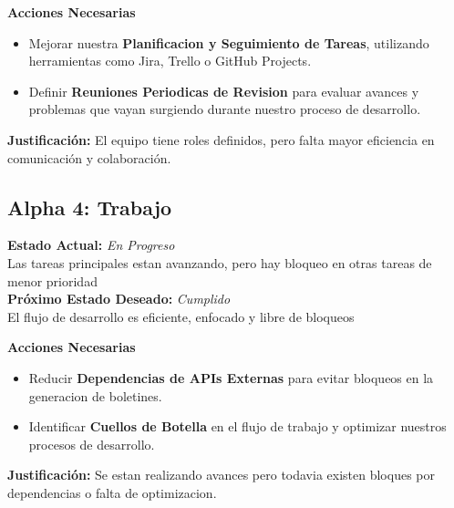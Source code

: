 \documentclass[12pt]{article}
\begin{document}
\vspace{0.1cm}

\textbf{Acciones Necesarias}
\begin{itemize}
    \item Mejorar nuestra \textbf{Planificacion y Seguimiento de Tareas}, 
    utilizando herramientas como Jira, Trello o GitHub Projects.
    \item Definir \textbf{Reuniones Periodicas de Revision}
    para evaluar avances y problemas que vayan surgiendo
    durante nuestro proceso de desarrollo.
\end{itemize}

\vspace{0.1cm}

\textbf{Justificación:} El equipo tiene 
roles definidos, pero falta mayor 
eficiencia en comunicación y colaboración.

\vspace{0.3cm}

\subsection{Alpha 4: Trabajo}

\textbf{Estado Actual:} \textit{En Progreso} \\
\hspace*{1cm} Las tareas principales estan 
avanzando, pero hay bloqueo en otras tareas 
de menor prioridad \\
\textbf{Próximo Estado Deseado:} \textit{Cumplido} \\
\hspace*{1cm} El flujo de desarrollo es
eficiente, enfocado y libre de bloqueos

\vspace{0.1cm}

\textbf{Acciones Necesarias}
\begin{itemize}
    \item Reducir \textbf{Dependencias de APIs Externas}
    para evitar bloqueos en la generacion
    de boletines.
    \item Identificar \textbf{Cuellos de Botella}
    en el flujo de trabajo y optimizar nuestros 
    procesos de desarrollo.
\end{itemize}

\vspace{0.1cm}

\textbf{Justificación:} Se estan realizando 
avances pero todavia existen bloques por 
dependencias o falta de optimizacion.
\end{document}
